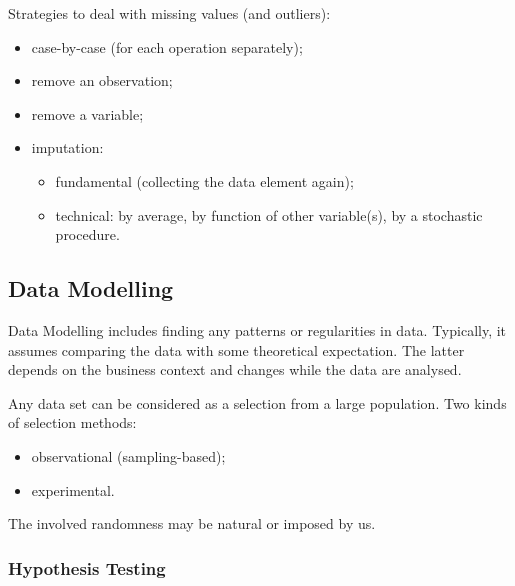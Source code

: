 \documentclass[12pt]{article}\usepackage[]{graphicx}\usepackage[]{xcolor}
\begin{document}
Strategies to deal with missing values (and outliers):
\begin{itemize}
  \item case-by-case (for each operation separately);
  \item remove an observation;
  \item remove a variable;
  \item imputation:
    \begin{itemize}
      \item fundamental (collecting the data element again);
      \item technical: by average, by function of other variable(s), 
        by a stochastic procedure. 
    \end{itemize}
\end{itemize}

\newpage
\subsection*{Data Modelling}

Data Modelling includes finding any patterns or regularities in data.
Typically, it assumes comparing the data with some theoretical expectation.
The latter depends on the business context and changes while the data are analysed. 

Any data set can be considered as a selection from a large population.
Two kinds of selection methods:
\begin{itemize}
  \item observational (sampling-based);
  \item experimental.
\end{itemize}
The involved randomness may be natural or imposed by us.

\subsubsection*{Hypothesis Testing}
\end{document}
